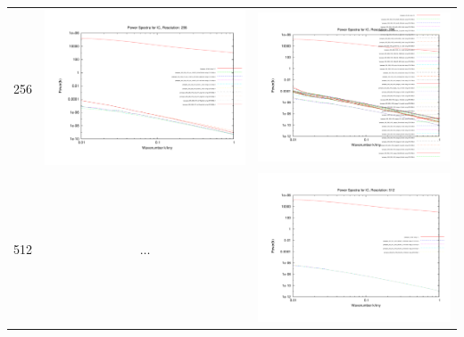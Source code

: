 \documentclass[a4paper,11pt,fleqn,oneside]{book}
\begin{document}
\begin{itemize}
\begin{table}
\begin{tabular}{l|c|c}
 256 & \includegraphics[scale=0.2]{analysis/powerspectra/IC_powspec_combined_256_h70.pdf} & \includegraphics[scale=0.2]{analysis/powerspectra/IC_powspec_combined_256_h100.pdf} \\
 512 & $\dots$ & \includegraphics[scale=0.2]{analysis/powerspectra/IC_powspec_combined_512_h100.pdf} \\


\end{tabular}
\end{table}
\end{itemize}
\end{document}
